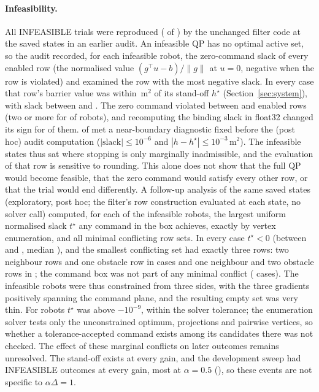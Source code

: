 \documentclass[journal]{IEEEtran}
\begin{document}
\paragraph{Infeasibility.} All \InfTotal{} INFEASIBLE trials were reproduced (\InfRepro{} of
\InfTotal) by the unchanged filter code at the saved states in an earlier audit. An infeasible QP
has no optimal active set, so the audit recorded, for each infeasible robot, the zero-command slack of
every enabled row (the normalised value $(g^\top u-b)/\|g\|$ at $u=0$, negative when the row is
violated) and examined the row with the most negative slack. In every case that row's barrier value was
within \InfHdiffMax{}\,m$^2$ of its stand-off $h^\star$ (Section~\ref{sec:system}), with slack between
\InfSlackMin{} and \InfSlackMax. The zero command violated between \InfRowsMin{} and \InfRowsMax{}
enabled rows (two or more for \InfRowsTwoPlus{} of \InfRobots{} robots), and recomputing the binding
slack in float32 changed its sign for \InfFlipFthirtytwo{} of them. \InfNear{} of \InfRobots{} met a
near-boundary diagnostic fixed before the (post hoc) audit computation ($|\text{slack}|\le10^{-6}$ and
$|h-h^\star|\le10^{-3}$\,m$^2$). The infeasible states thus sat where stopping is only marginally
inadmissible, and the evaluation of that row is sensitive to rounding. This alone does not show that the full
QP would become feasible, that the zero command would satisfy every other row, or that the trial would
end differently. A follow-up analysis of the same saved states (exploratory, post hoc; the filter's row
construction evaluated at each state, no solver call) computed, for each of the \ConfRobots{} infeasible
robots, the largest uniform normalised slack $t^\star$ any command in the box achieves, exactly by
vertex enumeration, and all minimal conflicting row sets. In every case $t^\star<0$ (between
\ConfTstarMin{} and \ConfTstarMax, median \ConfTstarMed), and the smallest conflicting set had exactly
three rows: two neighbour rows and one obstacle row in \ConfNNO{} cases and one neighbour and two
obstacle rows in \ConfNOO; the command box was not part of any minimal conflict (\ConfBoxNeeded{}
cases). The infeasible robots were thus constrained from three sides, with the three gradients
positively spanning the command plane, and the resulting empty set was very thin. For \ConfWithinTol{}
robots $t^\star$ was above $-10^{-9}$, within the solver tolerance; the enumeration solver tests only the
unconstrained optimum, projections and pairwise vertices, so whether a tolerance-accepted command exists
among its candidates there was not checked. The effect of these marginal conflicts on later outcomes
remains unresolved. The stand-off exists
at every gain, and the development sweep had INFEASIBLE outcomes at every gain, most at $\alpha=0.5$
(\SelInfhalf), so these events are not specific to $\alpha\Delta=1$.
\end{document}
